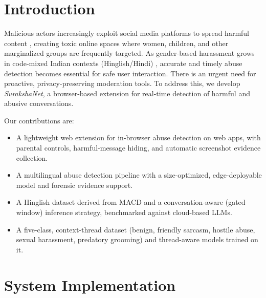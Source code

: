 \documentclass[sigconf,9pt]{acmart}
\begin{document}
\section{Introduction}
Malicious actors increasingly exploit social media platforms to spread harmful content \cite{Mathew_Saha_Yimam_Biemann_Goyal_Mukherjee_2021}, creating toxic online spaces where women, children, and other marginalized groups are frequently targeted. As gender-based harassment grows in code-mixed Indian contexts (Hinglish/Hindi) \cite{NEURIPS2022_a7c4163b}, accurate and timely abuse detection becomes essential for safe user interaction. There is an urgent need for proactive, privacy-preserving moderation tools. To address this, we develop \textit{SurakshaNet}, a browser-based extension for real-time detection of harmful and abusive conversations.

\par Our contributions are:
\begin{itemize}
    \item A lightweight web extension for in-browser abuse detection on web apps, with parental controls, harmful-message hiding, and automatic screenshot evidence collection.
    \item A multilingual abuse detection pipeline with a size-optimized, edge-deployable model and forensic evidence support.
    \item A Hinglish dataset derived from MACD and a conversation-aware (gated window) inference strategy, benchmarked against cloud-based LLMs.
    \item A five-class, context-thread dataset (benign, friendly sarcasm, hostile abuse, sexual harassment, predatory grooming) and thread-aware models trained on it.
\end{itemize}

\section{System Implementation}
\end{document}
